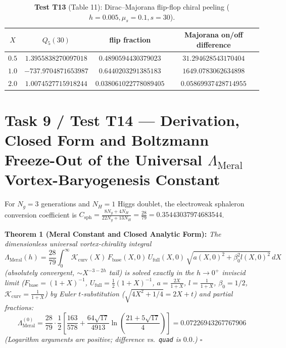 \documentclass[12pt,a4paper]{article}
\begin{document}
\begin{table}[htbp]
\centering
\footnotesize
\setlength{\tabcolsep}{3pt}
\caption{\textbf{Test T13} (Table 11): Dirac--Majorana flip-flop chiral peeling ($h=0.005, \mu_s=0.1, s=30$).}
\vspace{0.1cm}
\begin{tabular}{@{}c|ccc@{}}
\hline
$X$ & $Q_5(30)$ & flip fraction & Majorana on/off difference \\
\hline
$0.5$ & $1.3955838270097018$ & $0.4890594430379023$ & $31.294628543170404$ \\
$1.0$ & $-737.9704871653987$ & $0.6440203291385183$ & $1649.0783062634898$ \\
$2.0$ & $1.0074527715918244$ & $0.038061022778089405$ & $0.05869937428714955$ \\
\hline
\end{tabular}
\end{table}

\section{Task 9 / Test T14 --- Derivation, Closed Form and Boltzmann Freeze-Out of the Universal $\Lambda_{\mathrm{Meral}}$ Vortex-Baryogenesis Constant}

For $N_g = 3$ generations and $N_H = 1$ Higgs doublet, the electroweak sphaleron conversion coefficient is $C_{\mathrm{sph}} = \frac{8N_g + 4N_H}{22N_g + 13N_H} = \frac{28}{79} = 0.35443037974683544$.

\textbf{Theorem 1 (Meral Constant and Closed Analytic Form):} \textit{The dimensionless universal vortex-chirality integral}
\begin{equation}
\Lambda_{\mathrm{Meral}}(h) = \frac{28}{79} \int_0^\infty \mathcal{K}_{\mathrm{curv}}(X) \, F_{\mathrm{base}}(X, 0) \, U_{\mathrm{full}}(X, 0) \, \sqrt{a(X, 0)^2 + \beta_0^2 l(X, 0)^2} \, dX
\label{eq:meral}
\end{equation}
\textit{(absolutely convergent, $\sim X^{-3-2h}$ tail) is solved exactly in the $h \to 0^+$ inviscid limit ($F_{\mathrm{base}} = (1+X)^{-1}$, $U_{\mathrm{full}} = \frac{1}{2}(1+X)^{-1}$, $a = \frac{2X}{1+X}$, $l = \frac{1}{1+X}$, $\beta_0 = 1/2$, $\mathcal{K}_{\mathrm{curv}} = \frac{1}{1+X}$) by Euler $t$-substitution ($\sqrt{4X^2+1/4} = 2X+t$) and partial fractions:}
\begin{equation}
\boxed{\Lambda_{\mathrm{Meral}}^{(0)} = \frac{28}{79} \cdot \frac{1}{2} \left[ \frac{163}{578} + \frac{64\sqrt{17}}{4913} \ln\left( \frac{21 + 5\sqrt{17}}{4} \right) \right] = 0.07226943267767906}
\label{eq:meralclosed}
\end{equation}
\textit{(Logarithm arguments are positive; difference vs.\ \texttt{quad} is $0.0$.) $\square$}
\end{document}
